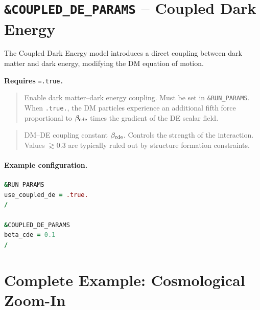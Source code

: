 \section{\texttt{\&COUPLED\_DE\_PARAMS} -- Coupled Dark Energy}
\label{sec:coupled_de_params}

The Coupled Dark Energy model introduces a direct coupling between
dark matter and dark energy, modifying the DM equation of motion.

\textbf{Requires} \texttt{=.true.}

\label{param:use_coupled_de}

\begin{quote}
Enable dark matter--dark energy coupling.  Must be set in
\texttt{\&RUN\_PARAMS}.  When \texttt{.true.}, the DM particles
experience an additional fifth force proportional to
$\beta_{\rm cde}$ times the gradient of the DE scalar field.
\end{quote}

\label{param:beta_cde}

\begin{quote}
DM--DE coupling constant $\beta_{\rm cde}$.  Controls the strength of
the interaction.  Values $\gtrsim 0.3$ are typically ruled out by
structure formation constraints.
\end{quote}

\paragraph{Example configuration.}
\begin{lstlisting}[language=Fortran]
&RUN_PARAMS
use_coupled_de = .true.
/

&COUPLED_DE_PARAMS
beta_cde = 0.1
/
\end{lstlisting}


\section{Complete Example: Cosmological Zoom-In}
\label{sec:example}

